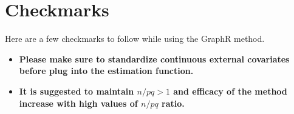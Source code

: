 \documentclass[
]{book}
\begin{document}
\hypertarget{checkmarks}{%
\section{Checkmarks}\label{checkmarks}}

Here are a few checkmarks to follow while using the GraphR method.

\begin{itemize}
\item
  \textbf{Please make sure to standardize continuous external covariates before plug into the estimation function.}
\item
  \textbf{It is suggested to maintain \(n/pq >1\) and efficacy of the method increase with high values of \(n/pq\) ratio.}
\end{itemize}

  
\end{document}
